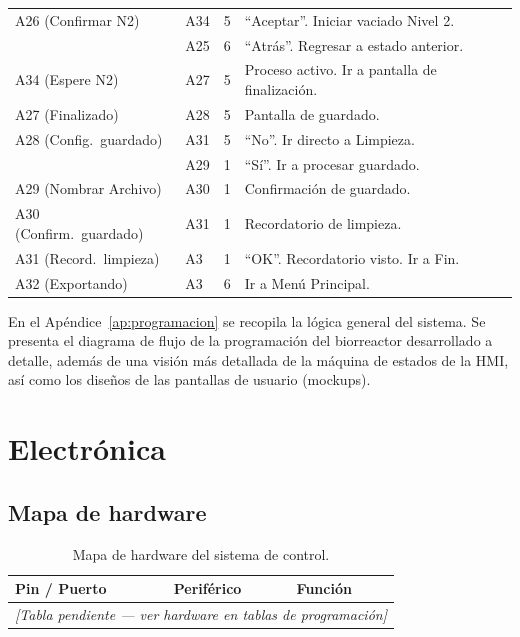 \documentclass[11pt,tesis,twoside,openright,spanish]{upiiztt}
\begin{document}
\begin{longtable}{p{2.5cm}p{1.5cm}p{1.5cm}p{7cm}}
A26 (Confirmar N2)  & A34 & 5 & ``Aceptar''. Iniciar vaciado Nivel 2. \\
                    & A25 & 6 & ``Atrás''. Regresar a estado anterior. \\
A34 (Espere N2)     & A27 & 5 & Proceso activo. Ir a pantalla de finalización. \\
A27 (Finalizado)    & A28 & 5 & Pantalla de guardado. \\
A28 (Config.\ guardado) & A31 & 5 & ``No''. Ir directo a Limpieza. \\
                    & A29 & 1 & ``Sí''. Ir a procesar guardado. \\
A29 (Nombrar Archivo) & A30 & 1 & Confirmación de guardado. \\
A30 (Confirm.\ guardado) & A31 & 1 & Recordatorio de limpieza. \\
A31 (Record.\ limpieza) & A3 & 1 & ``OK''. Recordatorio visto. Ir a Fin. \\
A32 (Exportando)    & A3 & 6 & Ir a Menú Principal. \\
\end{longtable}

En el Apéndice~\ref{ap:programacion} se recopila la lógica general del sistema. Se presenta el diagrama
de flujo de la programación del biorreactor desarrollado a detalle, además de una
visión más detallada de la máquina de estados de la HMI, así como los diseños de
las pantallas de usuario (mockups).

\section{Electrónica}

\subsection{Mapa de hardware}

\begin{table}[H]
  \centering
  \caption{Mapa de hardware del sistema de control.}
  \label{tab:mapa_hardware}
  \begin{tabular}{lll}
    \toprule
    \textbf{Pin / Puerto} & \textbf{Periférico} & \textbf{Función} \\
    \midrule
    \multicolumn{3}{c}{\textit{[Tabla pendiente — ver hardware en tablas de programación]}} \\
    \bottomrule
  \end{tabular}
\end{table}
\end{document}
